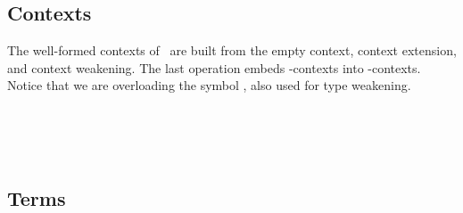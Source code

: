\subsection{Contexts}
The well-formed contexts of \GTT\ are built from the empty context, context extension, and context weakening. The last operation embeds -contexts into -contexts. 
Notice that we are overloading the symbol , also used for type weakening.
\begin{AgdaAlign}
\begin{code}%
\>[0]\AgdaSpace{}%
\AgdaSpace{}%
\AgdaSymbol{:}\AgdaSpace{}%
\AgdaSpace{}%
\AgdaSpace{}%
\AgdaSpace{}%
\<%
\\
\>[0][@{}l@{\AgdaIndent{0}}]%
\>[2]\AgdaSpace{}%
\AgdaSymbol{:}\AgdaSpace{}%
\AgdaSpace{}%
\AgdaSymbol{\{}\AgdaSymbol{\}}\AgdaSpace{}%
\AgdaSpace{}%
\AgdaSpace{}%
\<%
\\
%
\>[2]\AgdaOperator{\AgdaInductiveConstructor{\AgdaUnderscore{},\AgdaUnderscore{}}}\AgdaSpace{}%
\AgdaSymbol{:}\AgdaSpace{}%
\AgdaSpace{}%
\AgdaSymbol{\{}\AgdaSymbol{\}}\AgdaSpace{}%
\AgdaSpace{}%
\AgdaSpace{}%
\AgdaSpace{}%
\AgdaSpace{}%
\AgdaSpace{}%
\AgdaSpace{}%
\AgdaSpace{}%
\AgdaSpace{}%
\<%
\\
%
\>[2]\AgdaSpace{}%
\AgdaSymbol{:}\AgdaSpace{}%
\AgdaSpace{}%
\AgdaSpace{}%
\AgdaSpace{}%
\AgdaSpace{}%
\<%
\end{code}
\end{AgdaAlign}


\subsection{Terms}


